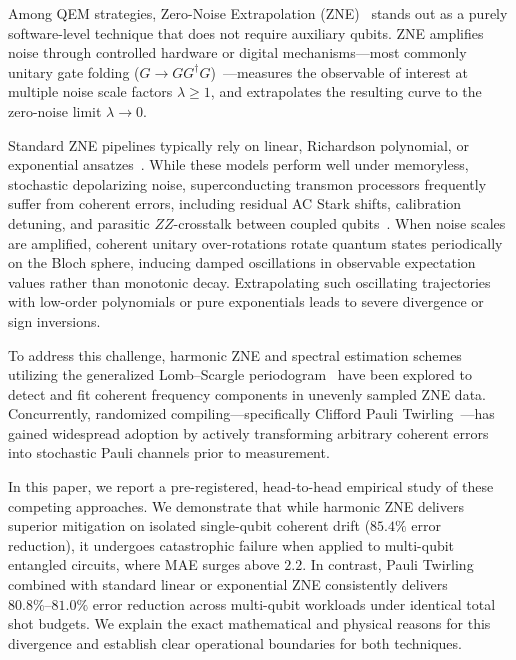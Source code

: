 \documentclass[10pt,twocolumn,a4paper]{article}
\begin{document}
Among QEM strategies, Zero-Noise Extrapolation (ZNE)~\cite{temme2017,li2017,kandala2019} stands out as a purely software-level technique that does not require auxiliary qubits. ZNE amplifies noise through controlled hardware or digital mechanisms—most commonly unitary gate folding ($G \to G G^\dagger G$)~\cite{giurgica2020}—measures the observable of interest at multiple noise scale factors $\lambda \ge 1$, and extrapolates the resulting curve to the zero-noise limit $\lambda \to 0$.

Standard ZNE pipelines typically rely on linear, Richardson polynomial, or exponential ansatzes~\cite{temme2017,giurgica2020}. While these models perform well under memoryless, stochastic depolarizing noise, superconducting transmon processors frequently suffer from coherent errors, including residual AC Stark shifts, calibration detuning, and parasitic $ZZ$-crosstalk between coupled qubits~\cite{kandala2019,hashim2021}. When noise scales are amplified, coherent unitary over-rotations rotate quantum states periodically on the Bloch sphere, inducing damped oscillations in observable expectation values rather than monotonic decay. Extrapolating such oscillating trajectories with low-order polynomials or pure exponentials leads to severe divergence or sign inversions.

To address this challenge, harmonic ZNE and spectral estimation schemes utilizing the generalized Lomb--Scargle periodogram~\cite{lomb1976,scargle1982} have been explored to detect and fit coherent frequency components in unevenly sampled ZNE data. Concurrently, randomized compiling—specifically Clifford Pauli Twirling~\cite{wallman2016,hashim2021}—has gained widespread adoption by actively transforming arbitrary coherent errors into stochastic Pauli channels prior to measurement.

In this paper, we report a pre-registered, head-to-head empirical study of these competing approaches. We demonstrate that while harmonic ZNE delivers superior mitigation on isolated single-qubit coherent drift ($85.4\%$ error reduction), it undergoes catastrophic failure when applied to multi-qubit entangled circuits, where MAE surges above $2.2$. In contrast, Pauli Twirling combined with standard linear or exponential ZNE consistently delivers $80.8\%\text{--}81.0\%$ error reduction across multi-qubit workloads under identical total shot budgets. We explain the exact mathematical and physical reasons for this divergence and establish clear operational boundaries for both techniques.
\end{document}
